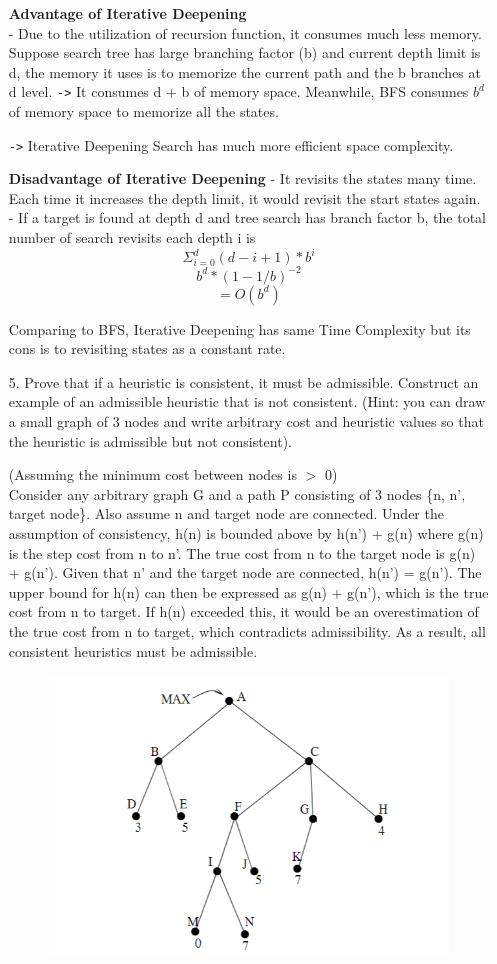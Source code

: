 \documentclass{article}
\begin{document}
\begin{enumerate}
\textbf{Advantage of Iterative Deepening}\\
- Due to the utilization of recursion function, it consumes much less memory.
Suppose search tree has large branching factor (b) and current depth limit is d, the memory it uses is to memorize the current path and the b branches at d level.
\verb|->| It consumes d + b of memory space.
Meanwhile, BFS consumes $b^d$ of memory space to memorize all the states.

\verb|->| Iterative Deepening Search has much more efficient space complexity.

\textbf{Disadvantage of Iterative Deepening}
- It revisits the states many time. Each time it increases the depth limit, it would revisit the start states again.\\
- If a target is found at depth d and tree search has branch factor b, the total number of search revisits each depth i is 
\[ \Sigma_{i=0}^d (d-i+1) \ast b^i \]
\[ b^d \ast (1 - 1/b)^{-2} \]
\[ = O(b^d)\]

Comparing to BFS, Iterative Deepening has same Time Complexity but its cons is to revisiting states as a constant rate.

\item[5.]
Prove that if a heuristic is consistent, it must be admissible. Construct an example of an admissible
heuristic that is not consistent. (Hint: you can draw a small graph of 3 nodes and write arbitrary cost and heuristic values
so that the heuristic is admissible but not consistent).

(Assuming the minimum cost between nodes is $>$ 0)\\
Consider any arbitrary graph G and a path P consisting of 3 nodes \{n, n', target node\}.  Also assume n and target node are connected.  Under the assumption of consistency, h(n) is bounded above by h(n') + g(n) where g(n) is the step cost from n to n'.  The true cost from n to the target node is g(n) + g(n').  Given that n' and the target node are connected, h(n') = g(n').  The upper bound for h(n) can then be expressed as g(n) + g(n'), which is the true cost from n to target.  If h(n) exceeded this, it would be an overestimation of the true cost from n to target, which contradicts admissibility.  As a result, all consistent heuristics must be admissible.

\begin{figure}[h!]
    \centering
    \includegraphics[width=.4\linewidth]{AI2 P7 b.png}
    \caption{}
    \label{bidirectional}
\end{figure}


\end{enumerate}
\end{document}
